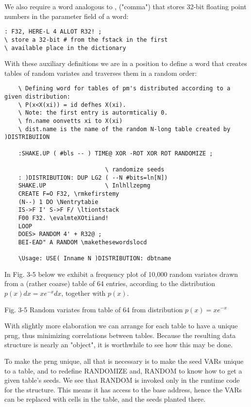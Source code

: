 We also require a word analogous to , ("comma") that stores
32-bit floating point numbers in the parameter field of a word:

\begin{verbatim}
: F32, HERE-L 4 ALLOT R32! ;
\ store a 32-bit # from the fstack in the first
\ available place in the dictionary
\end{verbatim}

With these auxiliary definitions we are in a position to define a
word that creates tables of random variates and traverses them in a random order:

\begin{verbatim}
    \ Defining word for tables of pm's distributed according to a given distribution:
    \ P(x<X(xi)) = id defhes X(xi).
    \ Note: the first entry is autormticaliy 0.  
    \ fn.name oonvetts xi to X(xi) 
    \ dist.name is the name of the random N-long table created by )DISTRIBUIION

    :SHAKE.UP ( #bls -- ) TIME@ XOR -ROT XOR ROT RANDOMIZE ;

                             \ randomize seeds
    : )DISTRIBUTION: DUP LG2 ( --N #bits=ln[N])
    SHAKE.UP                 \ Inlhllzepmg
    CREATE F=O F32, \rmkefirstemy
    (N--) 1 DO \Nentrytabie
    IS->F I' S->F F/ \ltiontstack
    F00 F32. \evalmteXOtiiand!
    LOOP
    DOES> RANDOM 4' + R32@ ;
    BEI-EAD" A RANDOM \makethesewordslocd

    \Usage: USE( Inname N )DISTRIBUTION: dbtname
\end{verbatim}
In Fig. 3-5 below we exhibit a frequency plot of 10,000 random
variates drawn from a (rather coarse) table of 64 entries, according to the
distribution $p(x)dx=xe^{-x}dx$, together with $p(x)$.

 


 

 

 

 

 

 

 

 

 

 

 

 

Fig. 3-5 Random variates from table of 64 from distribution $p(x)=xe^{-x}$

With slightly more elaboration we can arrange for each table to 
have a unique prng, thus minimizing correlations between
tables. Because the resulting data structure is nearly an "object",
it is worthwhile to see how this may be done.

To make the prng unique, all that is necessary is to make the seed
VARs unique to a table, and to redefine RANDOMIZE and,
RANDOM to know how to get a given table’s seeds. We see that
RANDOM is invoked only in the runtime code for the structure.
This means it has access to the base address, hence the VARs
can be replaced with cells in the table, and the seeds planted there.

